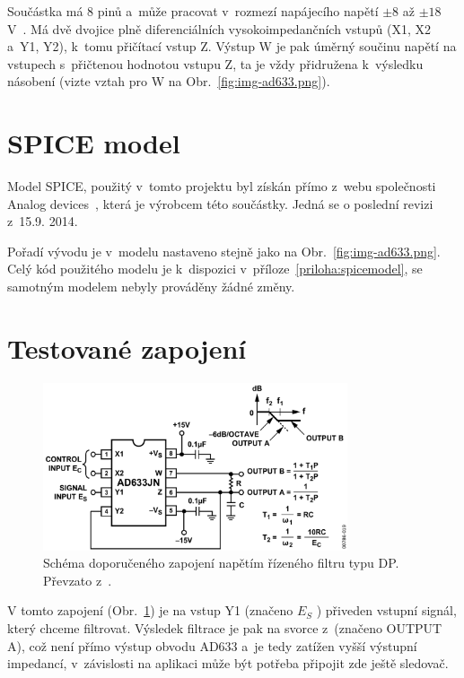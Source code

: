 \documentclass{protokol}
\begin{document}
	Součástka má 8 pinů a~může pracovat v~rozmezí napájecího napětí \(\pm 8\)  až  \(\pm 18\) V~\cite{ad633datasheet}. Má dvě dvojice plně diferenciálních vysokoimpedančních vstupů (X1, X2 a~Y1, Y2), k~tomu přičítací vstup Z. Výstup W je pak úměrný součinu napětí na vstupech s~přičtenou hodnotou vstupu Z, ta je vždy přidružena k~výsledku násobení (vizte vztah pro W na Obr.~\ref{fig:img-ad633.png}).

\section{SPICE model}
	Model SPICE, použitý v~tomto projektu byl získán přímo z~webu společnosti Analog devices~\cite{spicemodel}, která je výrobcem této součástky. Jedná se o poslední revizi z~15.9. 2014. 

	Pořadí vývodu je v~modelu nastaveno stejně jako na Obr.~\ref{fig:img-ad633.png}. Celý kód použitého modelu je k~dispozici v~příloze~\ref{priloha:spicemodel}, se samotným modelem nebyly prováděny žádné změny.

\section{Testované zapojení}
	\begin{figure}[h!]
		\centering
		\includegraphics[width=0.8\textwidth]{img/schema.png}
		\caption{Schéma doporučeného zapojení napětím řízeného filtru typu DP. Převzato z~\cite{ad633datasheet}.}
		\label{fig:img-schema-png}
	\end{figure}

	V tomto zapojení (Obr.~\ref{fig:img-schema-png}) je na vstup Y1 (značeno \(E_{S} \) ) přiveden vstupní signál, který chceme filtrovat. Výsledek filtrace je pak na svorce z~(značeno OUTPUT A), což není přímo výstup obvodu AD633 a~je tedy zatížen vyšší výstupní impedancí, v~závislosti na aplikaci může být potřeba připojit zde ještě sledovač.
\end{document}
